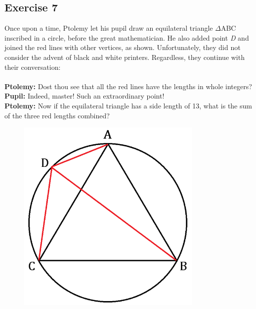 \documentclass[12pt]{article}
\begin{document}
\subsection*{Exercise 7}
Once upon a time, Ptolemy let his pupil draw an equilateral triangle $\Delta$ABC inscribed in a circle, before the great mathematician. He also added point \textit{D} and joined the red lines with other vertices, as shown. Unfortunately, they did not consider the advent of black and white printers. Regardless, they continue with their conversation:
\\
\\
\textbf{Ptolemy:} Dost thou see that all the red lines have the lengths in whole integers?
\\
\textbf{Pupil:} Indeed, master! Such an extraordinary point!
\\
\textbf{Ptolemy:} Now if the equilateral triangle has a side length of 13, what is the sum of the three red lengths combined?

\begin{figure}[htp]
    \includegraphics[width=9cm]{img1.png}
\end{figure}
\vspace{2in}
\end{document}
